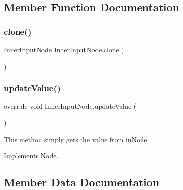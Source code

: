\subsection{Member Function Documentation}
\mbox{\label{class_inner_input_node_ae5611efed948ab50400a6204319490a5}} 
\subsubsection{\texorpdfstring{clone()}{clone()}}
{\footnotesize\ttfamily \mbox{\hyperlink{class_inner_input_node}{Inner\+Input\+Node}} Inner\+Input\+Node.\+clone (\begin{DoxyParamCaption}{ }\end{DoxyParamCaption})}

\mbox{\label{class_inner_input_node_ac67f9a1dcd0ae72d2d7fe4cfa7f91152}} 
\subsubsection{\texorpdfstring{update\+Value()}{updateValue()}}
{\footnotesize\ttfamily override void Inner\+Input\+Node.\+update\+Value (\begin{DoxyParamCaption}{ }\end{DoxyParamCaption})\hspace{0.3cm}{\ttfamily [virtual]}}



This method simply gets the value from in\+Node. 



Implements \mbox{\hyperlink{class_node_a85ebd0e36c25430570b94f923afd2a62}{Node}}.



\subsection{Member Data Documentation}
\mbox{\label{class_inner_input_node_a59c3f5f1aacedbf2bebab494d9e75f91}} 
